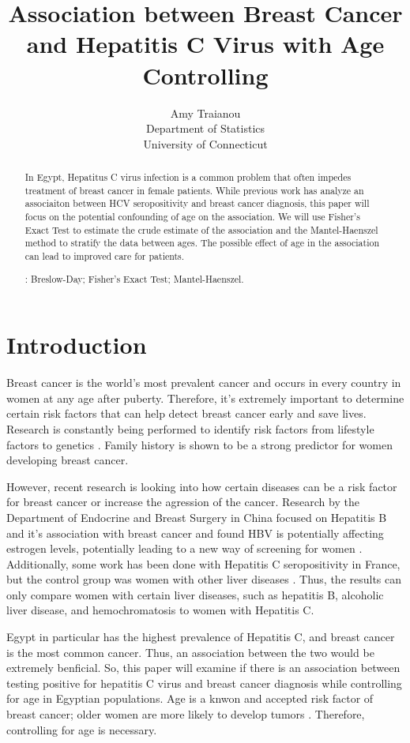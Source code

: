 \documentclass[12pt, titlepage]{article}
\title{Association between Breast Cancer and Hepatitis C Virus with Age Controlling}
\author{Amy Traianou\\
  Department of Statistics\\
  University of Connecticut
}
\begin{document}
\maketitle


\begin{abstract}
In Egypt, Hepatitus C virus infection is a common problem that often impedes treatment
of breast cancer in female patients. While previous work has analyze an associaiton 
between HCV seropositivity and breast cancer diagnosis, this paper will focus on the 
potential confounding of age on the association. We will use Fisher's Exact Test to
estimate the crude estimate of the association and the Mantel-Haenszel method to 
stratify the data between ages. The possible effect of age in the association can
lead to improved care for patients. 


\bigskip
{}:
Breslow-Day;
Fisher's Exact Test;
Mantel-Haenszel.
\end{abstract}


\section{Introduction}
\label{sec:intro}

Breast cancer is the world's most prevalent cancer and occurs in 
every country in women at any age after puberty. Therefore,
it's extremely important to determine certain risk factors 
that can help detect breast cancer early and save lives. Research 
is constantly being performed to identify risk factors from lifestyle
factors to genetics \citep{sun2017risk}. Family history is shown to 
be a strong predictor for women developing breast cancer. 

However, recent research is looking into how certain diseases can be a risk 
factor for breast cancer or increase the agression of the cancer. 
Research by the Department of Endocrine and Breast Surgery in China 
focused on Hepatitis B and it's association with breast cancer and found 
HBV is potentially affecting estrogen levels, potentially leading 
to a new way of screening for women \citep{vishnu2016does}. Additionally,
some work has been done with Hepatitis C seropositivity in France, but 
the control group was women with other liver diseases \citep{Larrey2010is}.
Thus, the results can only compare women with certain liver diseases, such as 
hepatitis B, alcoholic liver disease, and hemochromatosis to 
women with Hepatitis C. 

Egypt in particular has the highest prevalence of Hepatitis C, and breast 
cancer is the most common cancer. Thus, an association between the two 
would be extremely benficial. So, this paper will examine if there is an 
association between testing positive for hepatitis C virus and breast cancer 
diagnosis while controlling for age in Egyptian populations. Age is a knwon 
and accepted risk factor of breast cancer; older women are more likely to 
develop tumors \citep{sun2017risk}. Therefore, controlling for age is necessary. 
\end{document}
